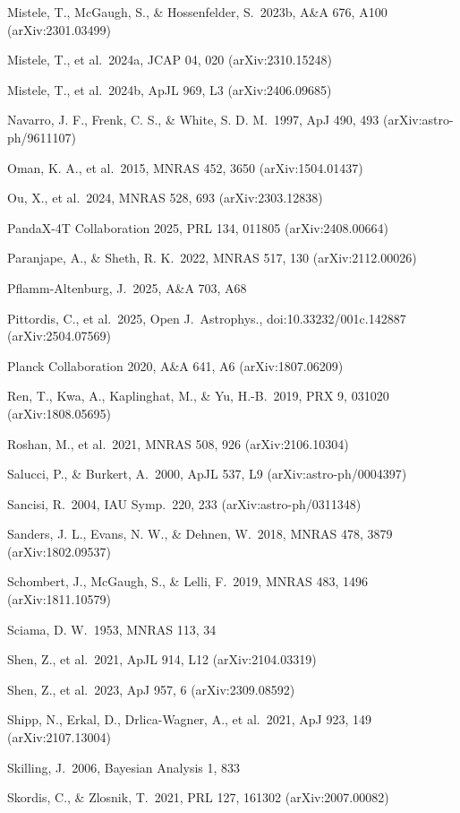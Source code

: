 \documentclass[
  10pt,
]{article}
\begin{document}
{\begin{list}{}{\setlength{\leftmargin}{1.5em}\setlength{\itemindent}{-1.5em}\setlength{\itemsep}{1pt}\setlength{\parsep}{0pt}}
\item Mistele, T., McGaugh, S., \& Hossenfelder, S.\ 2023b, A\&A 676, A100 (arXiv:2301.03499)
\item Mistele, T., et al.\ 2024a, JCAP 04, 020 (arXiv:2310.15248)
\item Mistele, T., et al.\ 2024b, ApJL 969, L3 (arXiv:2406.09685)
\item Navarro, J. F., Frenk, C. S., \& White, S. D. M.\ 1997, ApJ 490, 493 (arXiv:astro-ph/9611107)
\item Oman, K. A., et al.\ 2015, MNRAS 452, 3650 (arXiv:1504.01437)
\item Ou, X., et al.\ 2024, MNRAS 528, 693 (arXiv:2303.12838)
\item PandaX-4T Collaboration 2025, PRL 134, 011805 (arXiv:2408.00664)
\item Paranjape, A., \& Sheth, R. K.\ 2022, MNRAS 517, 130 (arXiv:2112.00026)
\item Pflamm-Altenburg, J.\ 2025, A\&A 703, A68
\item Pittordis, C., et al.\ 2025, Open J.\ Astrophys., doi:10.33232/001c.142887 (arXiv:2504.07569)
\item Planck Collaboration 2020, A\&A 641, A6 (arXiv:1807.06209)
\item Ren, T., Kwa, A., Kaplinghat, M., \& Yu, H.-B.\ 2019, PRX 9, 031020 (arXiv:1808.05695)
\item Roshan, M., et al.\ 2021, MNRAS 508, 926 (arXiv:2106.10304)
\item Salucci, P., \& Burkert, A.\ 2000, ApJL 537, L9 (arXiv:astro-ph/0004397)
\item Sancisi, R.\ 2004, IAU Symp.\ 220, 233 (arXiv:astro-ph/0311348)
\item Sanders, J. L., Evans, N. W., \& Dehnen, W.\ 2018, MNRAS 478, 3879 (arXiv:1802.09537)
\item Schombert, J., McGaugh, S., \& Lelli, F.\ 2019, MNRAS 483, 1496 (arXiv:1811.10579)
\item Sciama, D. W.\ 1953, MNRAS 113, 34
\item Shen, Z., et al.\ 2021, ApJL 914, L12 (arXiv:2104.03319)
\item Shen, Z., et al.\ 2023, ApJ 957, 6 (arXiv:2309.08592)
\item Shipp, N., Erkal, D., Drlica-Wagner, A., et al.\ 2021, ApJ 923, 149 (arXiv:2107.13004)
\item Skilling, J.\ 2006, Bayesian Analysis 1, 833
\item Skordis, C., \& Zlosnik, T.\ 2021, PRL 127, 161302 (arXiv:2007.00082)

\end{list}}
\end{document}
